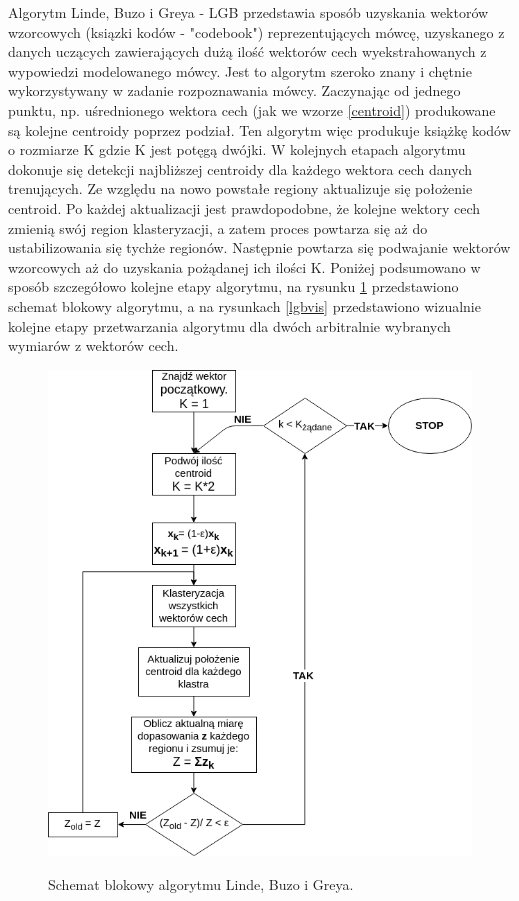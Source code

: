 Algorytm Linde, Buzo i Greya - LGB \cite{linde} przedstawia sposób uzyskania wektorów wzorcowych (ksiązki kodów - "codebook") reprezentujących mówcę, uzyskanego z danych uczących zawierających dużą ilość wektorów cech wyekstrahowanych z wypowiedzi modelowanego mówcy. Jest to algorytm szeroko znany i chętnie wykorzystywany \cite{minidsp} w zadanie rozpoznawania mówcy. Zaczynając od jednego punktu, np. uśrednionego wektora cech (jak we wzorze \ref{centroid}) produkowane są kolejne centroidy poprzez podział. Ten algorytm więc produkuje książkę kodów o rozmiarze K gdzie K jest potęgą dwójki. W kolejnych etapach algorytmu dokonuje się detekcji najbliższej centroidy dla każdego wektora cech danych trenujących. Ze względu na nowo powstałe regiony aktualizuje się położenie centroid. Po każdej aktualizacji jest prawdopodobne, że kolejne wektory cech zmienią swój region klasteryzacji, a zatem proces powtarza się aż do ustabilizowania się tychże regionów. Następnie powtarza się podwajanie wektorów wzorcowych aż do uzyskania pożądanej ich ilości K. Poniżej podsumowano w sposób szczegółowo kolejne etapy algorytmu, na rysunku \ref{lgbblock} przedstawiono schemat blokowy algorytmu, a na rysunkach \ref{lgbvis} przedstawiono wizualnie kolejne etapy przetwarzania algorytmu dla dwóch arbitralnie wybranych wymiarów z wektorów cech.
\\


\begin{figure}[ht!]
  \centering
    \includegraphics[width=1\textwidth]{lbgdiagram.png}
    \label{lgbblock}
    \caption{Schemat blokowy algorytmu Linde, Buzo i Greya. \cite{minidsp}}
\end{figure}

